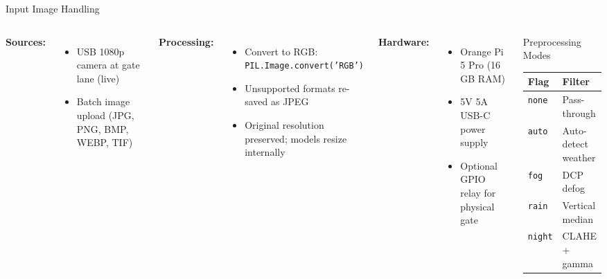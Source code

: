 \documentclass[aspectratio=169,11pt]{beamer}
\begin{document}
\begin{frame}{Input Image Handling}
  \begin{columns}[T]
    \textbf{Sources:}
    \begin{itemize}
      \item USB 1080p camera at gate lane (live)
      \item Batch image upload (JPG, PNG, BMP, WEBP, TIF)
    \end{itemize}
    \textbf{Processing:}
    \begin{itemize}
      \item Convert to RGB: \texttt{PIL.Image.convert('RGB')}
      \item Unsupported formats re-saved as JPEG
      \item Original resolution preserved; models resize internally
    \end{itemize}
    \textbf{Hardware:}
    \begin{itemize}
      \item Orange Pi 5 Pro (16\,GB RAM)
      \item 5V 5A USB-C power supply
      \item Optional GPIO relay for physical gate
    \end{itemize}
    \begin{block}{Preprocessing Modes}
      \begin{tabular}{@{}ll@{}}
        \toprule
        \textbf{Flag} & \textbf{Filter} \\
        \midrule
        \texttt{none} & Pass-through \\
        \texttt{auto} & Auto-detect weather \\
        \texttt{fog} & DCP defog \\
        \texttt{rain} & Vertical median \\
        \texttt{night} & CLAHE + gamma \\
        \bottomrule
      \end{tabular}
    \end{block}
  \end{columns}
\end{frame}
\end{document}

